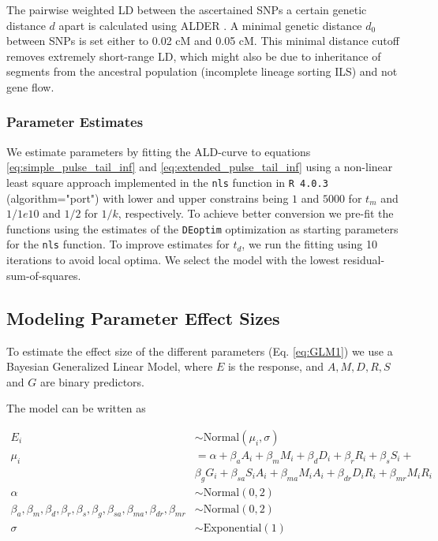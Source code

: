 \documentclass[11pt]{article}
\begin{document}
The pairwise weighted LD between the ascertained SNPs a certain genetic
distance \(d\) apart is calculated using ALDER
\citep{loh_inferring_2013}.  A minimal genetic distance \(d_0\) between
SNPs is set either to 0.02 cM and 0.05 cM. This minimal distance cutoff
removes extremely short-range LD, which might also be due to inheritance of segments from the ancestral population (incomplete lineage sorting ILS) and not gene flow. 

\subsubsection{Parameter Estimates}\label{Parameter estimate}

We estimate parameters by fitting the ALD-curve to equations \ref{eq:simple_pulse_tail_inf} and \ref{eq:extended_pulse_tail_inf}  using a non-linear least square approach implemented in the  \texttt{nls} function in \texttt{R 4.0.3} (algorithm="port") with lower and upper constrains being $1$ and $5000$ for $t_m$ and $1/1e10$ and $1/2$ for $1/k$, respectively. To achieve better conversion we pre-fit the functions using the estimates of the \texttt{DEoptim} optimization  \citep{ardia_deoptim_2016} as starting parameters for the \texttt{nls} function. To improve estimates for $t_d$, we run the fitting using 10 iterations to avoid local optima. We select the model with the lowest residual-sum-of-squares. 


\subsection{Modeling Parameter Effect Sizes}\label{modeling prameter effect sizes}

To estimate the effect size of the different parameters (Eq.
\ref{eq:GLM1}) we use a Bayesian Generalized Linear Model, where $E$ is the response, and $A, M, D, R, S$ and $G$ are binary predictors. 

The model can be written as 

\begin{equation}\label{eq:GLM1}
\begin{split}
E_i &\sim \text{Normal}(\mu_i,\sigma) \\
\mu_i &= \alpha + \beta_aA_i + \beta_mM_i + \beta_dD_i + \beta_rR_i + \beta_{s}S_i + \\ &\beta_gG_i + \beta_{sa}S_iA_i + \beta_{ma}M_iA_i + \beta_{dr}D_iR_i + \beta_{mr}M_iR_i \\
\alpha &\sim \text{Normal}(0,2) \\
\beta_a,\beta_m,\beta_d,\beta_r,\beta_{s},\beta_g,\beta_{sa}, \beta_{ma},\beta_{dr}, \beta_{mr} &\sim \text{Normal}(0,2) \\
\sigma &\sim \text{Exponential}(1)
\end{split}
\end{equation}
\end{document}
